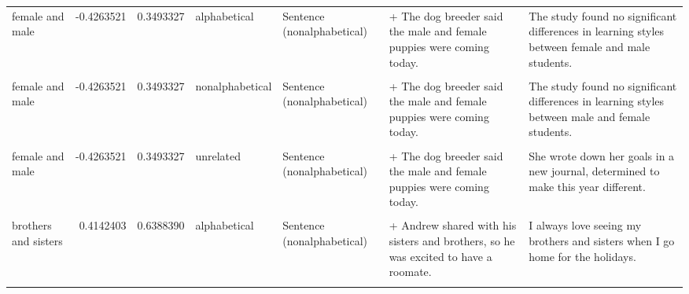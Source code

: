 \documentclass[
  12pt,
]{scrartcl}
\begin{document}
\begin{landscape}
\begin{longtable}{lrrllll}
female and male & -0.4263521 & 0.3493327 & alphabetical & Sentence (nonalphabetical) & + The dog breeder said the male and female puppies were coming today. & The study found no significant differences in learning styles between female and male students.\\
\cellcolor{gray!6}{female and male} & \cellcolor{gray!6}{-0.4263521} & \cellcolor{gray!6}{0.3493327} & \cellcolor{gray!6}{nonalphabetical} & \cellcolor{gray!6}{Sentence (alphabetical)} & \cellcolor{gray!6}{+ The dog breeder said the female and male puppies are coming today.} & \cellcolor{gray!6}{The study found no significant differences in learning styles between male and female students.}\\
female and male & -0.4263521 & 0.3493327 & nonalphabetical & Sentence (nonalphabetical) & + The dog breeder said the male and female puppies were coming today. & The study found no significant differences in learning styles between male and female students.\\
\cellcolor{gray!6}{female and male} & \cellcolor{gray!6}{-0.4263521} & \cellcolor{gray!6}{0.3493327} & \cellcolor{gray!6}{unrelated} & \cellcolor{gray!6}{Sentence (alphabetical)} & \cellcolor{gray!6}{+ The dog breeder said the female and male puppies are coming today.} & \cellcolor{gray!6}{She wrote down her goals in a new journal, determined to make this year different.}\\
\addlinespace
female and male & -0.4263521 & 0.3493327 & unrelated & Sentence (nonalphabetical) & + The dog breeder said the male and female puppies were coming today. & She wrote down her goals in a new journal, determined to make this year different.\\
\cellcolor{gray!6}{brothers and sisters} & \cellcolor{gray!6}{0.4142403} & \cellcolor{gray!6}{0.6388390} & \cellcolor{gray!6}{alphabetical} & \cellcolor{gray!6}{Sentence (alphabetical)} & \cellcolor{gray!6}{+ Andrew shared with his brothers and sisters, so he was excited to have a roomate.} & \cellcolor{gray!6}{I always love seeing my brothers and sisters when I go home for the holidays.}\\
brothers and sisters & 0.4142403 & 0.6388390 & alphabetical & Sentence (nonalphabetical) & + Andrew shared with his sisters and brothers, so he was excited to have a roomate. & I always love seeing my brothers and sisters when I go home for the holidays.\\
\cellcolor{gray!6}{brothers and sisters} & \cellcolor{gray!6}{0.4142403} & \cellcolor{gray!6}{0.6388390} & \cellcolor{gray!6}{nonalphabetical} & \cellcolor{gray!6}{Sentence (alphabetical)} & \cellcolor{gray!6}{+ Andrew shared with his brothers and sisters, so he was excited to have a roomate.} & \cellcolor{gray!6}{I always love seeing my sisters and brothers when I go home for the holidays.}\\

\end{longtable}
\end{landscape}
\end{document}
